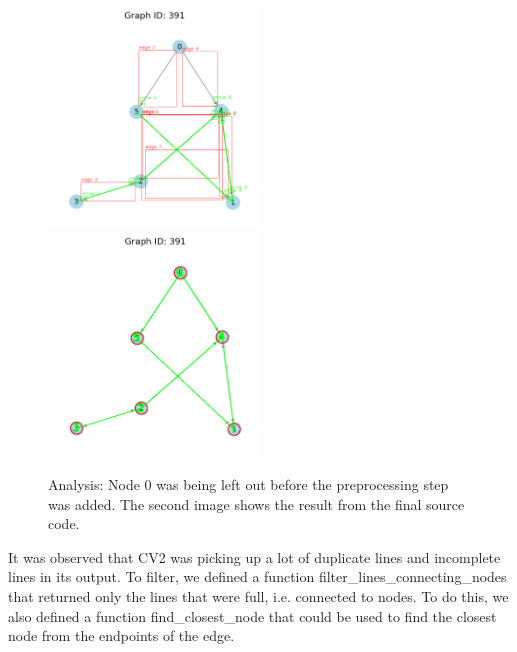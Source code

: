 \documentclass{article}
\begin{document}
\begin{figure}[h!]
    \centering
    \includegraphics[width=0.5\textwidth]{391_before_preprocessing.png}
    \includegraphics[width=0.5\textwidth]{391_after_preprocessing.png}
    \caption{Analysis: Node 0 was being left out before the preprocessing step was added. The second image shows the result from the final source code.}
    \label{fig:example}
\end{figure}

It was observed that CV2 was picking up a lot of duplicate lines and incomplete lines in its output. To filter, we defined a function filter\_lines\_connecting\_nodes that returned only the lines that were full, i.e. connected to nodes. To do this, we also defined a function find\_closest\_node that could be used to find the closest node from the endpoints of the edge.
\end{document}
